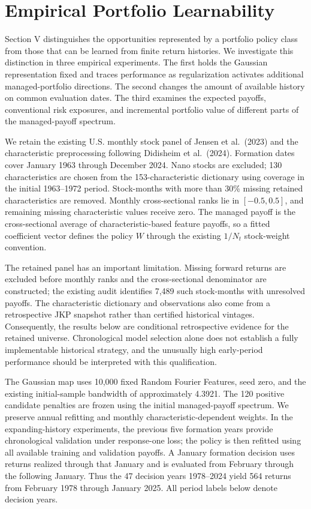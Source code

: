 \documentclass[12pt,letterpaper]{article}
\begin{document}
\section{Empirical Portfolio Learnability}

Section V distinguishes the opportunities represented by a portfolio policy class from those that can be learned from finite return histories. We investigate this distinction in three empirical experiments. The first holds the Gaussian representation fixed and traces performance as regularization activates additional managed-portfolio directions. The second changes the amount of available history on common evaluation dates. The third examines the expected payoffs, conventional risk exposures, and incremental portfolio value of different parts of the managed-payoff spectrum.

We retain the existing U.S. monthly stock panel of Jensen et al.\ (2023) and the characteristic preprocessing following Didisheim et al.\ (2024). Formation dates cover January 1963 through December 2024. Nano stocks are excluded; 130 characteristics are chosen from the 153-characteristic dictionary using coverage in the initial 1963--1972 period. Stock-months with more than 30\% missing retained characteristics are removed. Monthly cross-sectional ranks lie in $[-0.5,0.5]$, and remaining missing characteristic values receive zero. The managed payoff is the cross-sectional average of characteristic-based feature payoffs, so a fitted coefficient vector defines the policy $W$ through the existing $1/N_t$ stock-weight convention.

The retained panel has an important limitation. Missing forward returns are excluded before monthly ranks and the cross-sectional denominator are constructed; the existing audit identifies 7,489 such stock-months with unresolved payoffs. The characteristic dictionary and observations also come from a retrospective JKP snapshot rather than certified historical vintages. Consequently, the results below are conditional retrospective evidence for the retained universe. Chronological model selection alone does not establish a fully implementable historical strategy, and the unusually high early-period performance should be interpreted with this qualification.

The Gaussian map uses 10,000 fixed Random Fourier Features, seed zero, and the existing initial-sample bandwidth of approximately 4.3921. The 120 positive candidate penalties are frozen using the initial managed-payoff spectrum. We preserve annual refitting and monthly characteristic-dependent weights. In the expanding-history experiments, the previous five formation years provide chronological validation under response-one loss; the policy is then refitted using all available training and validation payoffs. A January formation decision uses returns realized through that January and is evaluated from February through the following January. Thus the 47 decision years 1978--2024 yield 564 returns from February 1978 through January 2025. All period labels below denote decision years.
\end{document}
